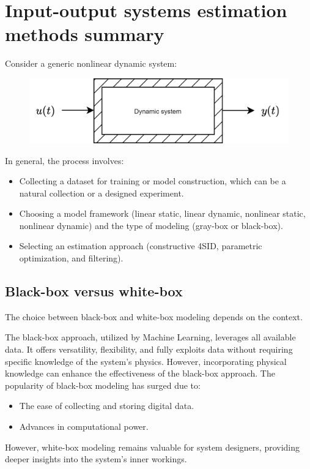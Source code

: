 \section{Input-output systems estimation methods summary}

Consider a generic nonlinear dynamic system:
\begin{figure}[H]
    \centering
    \includegraphics[width=0.6\linewidth]{images/sys1.png}
\end{figure}
In general, the process involves:
\begin{itemize}
    \item Collecting a dataset for training or model construction, which can be a natural collection or a designed experiment.
    \item Choosing a model framework (linear static, linear dynamic, nonlinear static, nonlinear dynamic) and the type of modeling (gray-box or black-box).
    \item Selecting an estimation approach (constructive 4SID, parametric optimization, and filtering).
\end{itemize}

\subsection{Black-box versus white-box}
The choice between black-box and white-box modeling depends on the context.

The black-box approach, utilized by Machine Learning, leverages all available data. 
It offers versatility, flexibility, and fully exploits data without requiring specific knowledge of the system's physics. 
However, incorporating physical knowledge can enhance the effectiveness of the black-box approach.
The popularity of black-box modeling has surged due to:
\begin{itemize}
    \item The ease of collecting and storing digital data.
    \item Advances in computational power.
\end{itemize}
However, white-box modeling remains valuable for system designers, providing deeper insights into the system's inner workings.